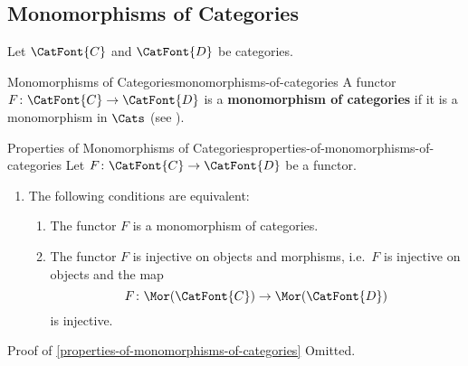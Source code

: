 \subsection{Monomorphisms of Categories}\label{subsection-monomorphisms-of-categories}
Let $\CatFont{C}$ and $\CatFont{D}$ be categories.
\begin{definition}{Monomorphisms of Categories}{monomorphisms-of-categories}%
    A functor $F\colon\CatFont{C}\to\CatFont{D}$ is a \textbf{monomorphism of categories} if it is a monomorphism in $\Cats$ (see ).%
\end{definition}
\begin{proposition}{Properties of Monomorphisms of Categories}{properties-of-monomorphisms-of-categories}%
    Let $F\colon\CatFont{C}\to\CatFont{D}$ be a functor.
    \begin{enumerate}
        \item\label{properties-of-monomorphisms-of-categories-characterisations}The following conditions are equivalent:
            \begin{enumerate}
                \item\label{properties-of-monomorphisms-of-categories-characterisations-a}The functor $F$ is a monomorphism of categories.
                \item\label{properties-of-monomorphisms-of-categories-characterisations-b}The functor $F$ is injective on objects and morphisms, i.e.\ $F$ is injective on objects and the map
                    \[
                        F%
                        \colon%
                        \Mor(\CatFont{C})%
                        \to%
                        \Mor(\CatFont{D})%
                    \]%
                    is injective.
            \end{enumerate}
    \end{enumerate}
\end{proposition}
\begin{Proof}{Proof of \cref{properties-of-monomorphisms-of-categories}}%
    Omitted.
\end{Proof}
